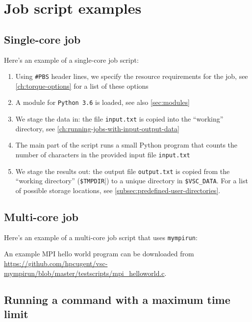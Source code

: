\chapter{Job script examples}
\label{ch:jobscript-examples}

\section{Single-core job}

Here's an example of a single-core job script:


\begin{enumerate}
    \item Using \lstinline|#PBS| header lines, we specify the resource requirements for the job,
        see \autoref{ch:torque-options} for a list of these options
    \item A module for \lstinline|Python 3.6| is loaded, see also \autoref{sec:modules}
    \item We stage the data in: the file \lstinline|input.txt| is copied into the ``working'' directory, see \autoref{ch:running-jobs-with-input-output-data}
    \item The main part of the script runs a small Python program that counts the
        number of characters in the provided input file \lstinline|input.txt|
    \item We stage the results out: the output file \lstinline|output.txt| is copied from
        the ``working directory'' (\lstinline|$TMPDIR||) to a unique directory in \lstinline|$VSC_DATA|.
        For a list of possible storage locations, see \autoref{subsec:predefined-user-directories}.
\end{enumerate}

\section{Multi-core job}

Here's an example of a multi-core job script that uses \lstinline|mympirun|:


An example MPI hello world program can be downloaded from \url{https://github.com/hpcugent/vsc-mympirun/blob/master/testscripts/mpi_helloworld.c}.


\section{Running a command with a maximum time limit}
\label{sec:maximum-timelimit-timeout-jobscript}

